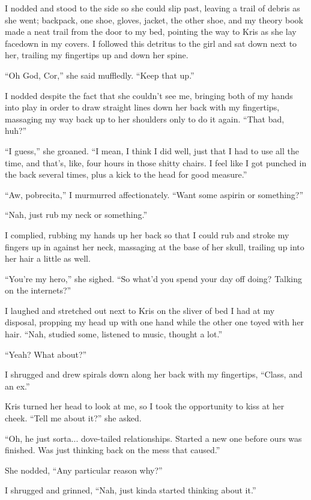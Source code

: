 I nodded and stood to the side so she could slip past, leaving a trail of debris as she went; backpack, one shoe, gloves, jacket, the other shoe, and my theory book made a neat trail from the door to my bed, pointing the way to Kris as she lay facedown in my covers.  I followed this detritus to the girl and sat down next to her, trailing my fingertips up and down her spine.

``Oh God, Cor,'' she said muffledly.  ``Keep that up.''

I nodded despite the fact that she couldn't see me, bringing both of my hands into play in order to draw straight lines down her back with my fingertips, massaging my way back up to her shoulders only to do it again.  ``That bad, huh?''

``I guess,'' she groaned.  ``I mean, I think I did well, just that I had to use all the time, and that's, like, four hours in those shitty chairs.  I feel like I got punched in the back several times, plus a kick to the head for good measure.''

``Aw, pobrecita,'' I murmurred affectionately.  ``Want some aspirin or something?''

``Nah, just rub my neck or something.''

I complied, rubbing my hands up her back so that I could rub and stroke my fingers up in against her neck, massaging at the base of her skull, trailing up into her hair a little as well.

``You're my hero,'' she sighed.  ``So what'd you spend your day off doing?  Talking on the internets?''

I laughed and stretched out next to Kris on the sliver of bed I had at my disposal, propping my head up with one hand while the other one toyed with her hair.  ``Nah, studied some, listened to music, thought a lot.''

``Yeah?  What about?''  

I shrugged and drew spirals down along her back with my fingertips, ``Class, and an ex.''

Kris turned her head to look at me, so I took the opportunity to kiss at her cheek.  ``Tell me about it?'' she asked.

``Oh, he just sorta... dove-tailed relationships.  Started a new one before ours was finished.  Was just thinking back on the mess that caused.''

She nodded, ``Any particular reason why?''

I shrugged and grinned, ``Nah, just kinda started thinking about it.''

